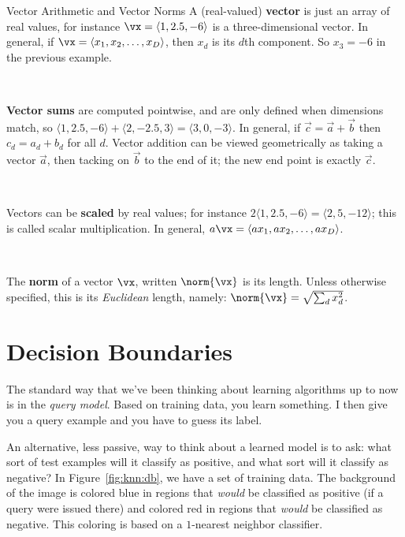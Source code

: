 \begin{mathreview}{Vector Arithmetic and Vector Norms}
  A (real-valued) \textbf{vector} is just an array of real values, for
  instance $\vx = \langle 1, 2.5, -6 \rangle$ is a three-dimensional
  vector. In general, if $\vx = \langle x_1, x_2, \dots, x_D \rangle$,
  then $x_d$ is its $d$th component. So $x_3 = -6$ in the previous
  example.

~

  \textbf{Vector sums} are computed pointwise, and are only defined when
  dimensions match, so $\langle 1, 2.5, -6 \rangle + \langle 2, -2.5,
  3 \rangle = \langle 3, 0, -3 \rangle$. In general, if $\vec c = \vec
  a + \vec b$ then $c_d = a_d + b_d$ for all $d$. Vector addition can
  be viewed geometrically as taking a vector $\vec a$, then tacking on
  $\vec b$ to the end of it; the new end point is exactly $\vec c$.

~

  Vectors can be \textbf{scaled} by real values; for instance $2
  \langle 1, 2.5, -6 \rangle = \langle 2, 5, -12 \rangle$; this is
  called scalar multiplication. In general, $a \vx = \langle a x_1, a
  x_2, \dots, a x_D \rangle$.

~

  The \textbf{norm} of a vector $\vx$, written $\norm{\vx}$ is its
  length. Unless otherwise specified, this is its \emph{Euclidean}
  length, namely: $\norm{\vx} = \sqrt{\sum_d x_d^2}$.
\end{mathreview}

\section{Decision Boundaries}

The standard way that we've been thinking about learning algorithms up
to now is in the \emph{query model}.  Based on training data, you
learn something.  I then give you a query example and you have to
guess its label.


An alternative, less passive, way to think about a learned model is to
ask: what sort of test examples will it classify as positive, and what
sort will it classify as negative?  In Figure~\ref{fig:knn:db}, we have a
set of training data.  The background of the image is colored blue in
regions that \emph{would} be classified as positive (if a query were
issued there) and colored red in regions that \emph{would} be
classified as negative.  This coloring is based on a $1$-nearest
neighbor classifier.

